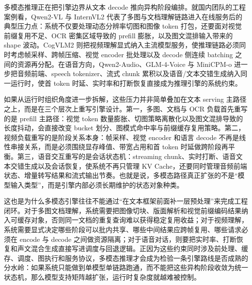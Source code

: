 多模态推理正在把引擎边界从文本 decode 推向异构阶段编排。就国内团队的工程案例看，Qwen2-VL 与 InternVL2 代表了多图与文档理解链路进入在线服务后的典型压力点：系统不仅要处理动态分辨率切图和图像 token 打包，还要面对视觉前缀复用不足、OCR 密集区域导致的 prefill 膨胀，以及图文混排输入带来的 shape 波动\citep{qwen2vl,internvl,wang2024qwen2vl,chen2024internvl2}。CogVLM2 则把视频理解显式纳入主流模型服务，使推理链路必须同时考虑帧采样、跨帧压缩、视觉 encoder 批处理以及 decode 侧连续 batching 之间的资源再分配\citep{cogvlm2,wang2024cogvlm2}。在语音方向，Qwen2-Audio、GLM-4-Voice 与 MiniCPM-o 进一步把音频前端、speech tokenizer、流式 chunk 累积以及语音/文本交错生成纳入同一运行时，使首 token 时延、实时率和打断恢复直接成为推理引擎的系统约束\citep{chu2024qwen2audio,zeng2024glm4voice,cui2026minicpmo45}。

如果从运行时组织角度进一步拆解，这些压力并非简单叠加在文本 serving 主路径之上，而是在三个层次上重写引擎设计。第一，多图、文档与 OCR 负载首先重写的是 prefill 主路径：视觉 token 数量膨胀、切图策略离散化以及图文混排导致的长度抖动，会直接改变 bucket 划分、图模式命中率与前缀缓存复用策略。第二，视频负载重写的是阶段关系本身：帧采样、视觉 encoder 和语言 decode 不再是线性串接关系，而是必须围绕显存峰值、带宽占用和首 token 时延做跨阶段再平衡。第三，语音交互重写的是会话状态机：streaming chunk、实时打断、语音文本交错生成以及会话恢复，使系统不再只管理 KV Cache，还要同时管理音频前端状态、增量转写结果和流式输出节奏。也就是说，多模态路径真正扩张的不是“模型输入类型”，而是引擎内部必须长期维护的状态对象种类。

这也是为什么多模态引擎往往不能通过“在文本框架前面补一层预处理”来完成工程闭环。对于多图文档理解，系统需要把图像切块、版面解析和视觉前缀编码结果纳入可缓存对象，否则同一文档的重复查询难以获得稳定复用收益；对于视频理解，系统需要显式决定哪些阶段可以批内共享、哪些中间结果应跨帧复用、哪些请求必须在 encode 与 decode 之间做资源隔离；对于语音对话，则要把实时率、打断恢复和声文混合生成直接写进调度与回退逻辑。正因为这些约束同时涉及前处理、缓存、调度、图执行和服务协议，多模态推理才会成为检验一条引擎路线是否成熟的分水岭：如果系统只能做到单模型单链路跑通，而不能把这些异构阶段收敛为统一状态机，那么模型支持矩阵越扩张，运行时复杂度就越难被控制。

